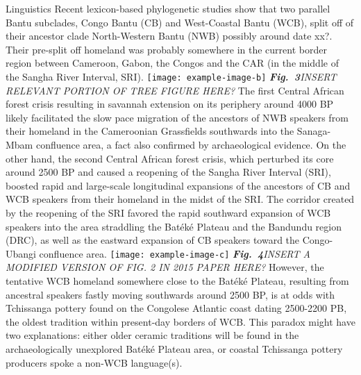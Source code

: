 \documentclass[a0]{sciposter}
\begin{document}
{\begin{minipage}[t][102cm][t]{82cm}
\begin{minipage}[t]{77cm}
\begin{multicols}{3}
\vfill\null
\columnbreak
{\fontsize{38}{42} \selectfont \textcolor{HeadCol}{Linguistics}}
\bigbreak
{\fontsize{28}{36} \selectfont Recent lexicon-based phylogenetic studies show that two parallel Bantu subclades, Congo Bantu (CB) and West-Coastal Bantu (WCB), split off of their ancestor clade North-Western Bantu (NWB) possibly around date xx?. Their pre-split off homeland was probably somewhere in the current border region between Cameroon, Gabon, the Congos and the CAR (in the middle of the Sangha River Interval, SRI).}
\bigbreak
\bigbreak
\texttt{[image: example-image-b]}
\bigbreak
{\fontsize{28}{36} \selectfont \textit{\textbf{Fig.~3}\hspace{1em}INSERT RELEVANT PORTION OF TREE FIGURE HERE?}}
\bigbreak
{\fontsize{28}{36} \selectfont The first Central African forest crisis resulting in savannah extension on its periphery around 4000 BP likely facilitated the slow pace migration of the ancestors of NWB speakers from their homeland in the Cameroonian Grassfields southwards into the Sanaga-Mbam confluence area, a fact also confirmed by archaeological evidence.}
\bigbreak
{\fontsize{28}{36} \selectfont On the other hand, the second Central African forest crisis, which perturbed its core around 2500 BP and caused a reopening of the Sangha River Interval (SRI), boosted rapid and large-scale longitudinal expansions of the ancestors of CB and WCB speakers from their homeland in the midst of the SRI. The corridor created by the reopening of the SRI favored the rapid southward expansion of WCB speakers into the area straddling the Batéké Plateau and the Bandundu region (DRC), as well as the eastward expansion of CB speakers toward the Congo-Ubangi confluence area.}
\bigbreak
\bigbreak
\texttt{[image: example-image-c]}
\bigbreak
{\fontsize{28}{36} \selectfont \textit{\textbf{Fig.~4}\hspace{1em}INSERT A MODIFIED VERSION OF FIG. 2 IN 2015 PAPER HERE?}}
\bigbreak
{\fontsize{28}{36} \selectfont However, the tentative WCB homeland somewhere close to the Batéké Plateau, resulting from ancestral speakers fastly moving southwards around 2500 BP, is at odds with Tchissanga pottery found on the Congolese Atlantic coast dating 2500-2200 PB, the oldest tradition within present-day borders of WCB. This paradox might have two explanations: either older ceramic traditions will be found in the archaeologically unexplored Batéké Plateau area, or coastal Tchissanga pottery producers spoke a non-WCB language(s).}

\vfill

\end{multicols}
\end{minipage}
\end{minipage}}
\end{document}
